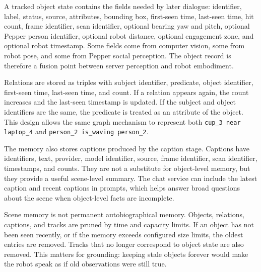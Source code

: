 A tracked object state contains the fields needed by later dialogue: identifier, label, status, source, attributes, bounding box, first-seen time, last-seen time, hit count, frame identifier, scan identifier, optional bearing yaw and pitch, optional Pepper person identifier, optional robot distance, optional engagement zone, and optional robot timestamp. Some fields come from computer vision, some from robot pose, and some from Pepper social perception. The object record is therefore a fusion point between server perception and robot embodiment.

Relations are stored as triples with subject identifier, predicate, object identifier, first-seen time, last-seen time, and count. If a relation appears again, the count increases and the last-seen timestamp is updated. If the subject and object identifiers are the same, the predicate is treated as an attribute of the object. This design allows the same graph mechanism to represent both \texttt{cup\_3 near laptop\_4} and \texttt{person\_2 is\_waving person\_2}.

The memory also stores captions produced by the caption stage. Captions have identifiers, text, provider, model identifier, source, frame identifier, scan identifier, timestamps, and counts. They are not a substitute for object-level memory, but they provide a useful scene-level summary. The chat service can include the latest caption and recent captions in prompts, which helps answer broad questions about the scene when object-level facts are incomplete.

Scene memory is not permanent autobiographical memory. Objects, relations, captions, and tracks are pruned by time and capacity limits. If an object has not been seen recently, or if the memory exceeds configured size limits, the oldest entries are removed. Tracks that no longer correspond to object state are also removed. This matters for grounding: keeping stale objects forever would make the robot speak as if old observations were still true.

